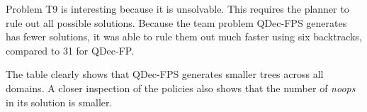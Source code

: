 \documentclass[letterpaper]{article} %
\theoremstyle{definition}
\begin{document}




Problem T9 is interesting because it is unsolvable.
This requires the planner to rule out all possible solutions. Because the team problem QDec-FPS generates has fewer solutions, it was able to
rule them out much faster 
using six backtracks, compared to 31 for QDec-FP. 

The table clearly shows that QDec-FPS generates smaller trees across all domains. A closer inspection of the policies also shows that the number of {\em noops} in its solution is smaller.
\end{document}
